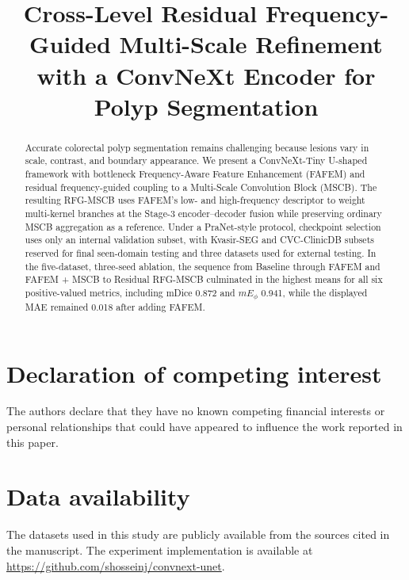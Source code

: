 \documentclass[
  10pt,
]{article}
\title{Cross-Level Residual Frequency-Guided Multi-Scale Refinement with a ConvNeXt Encoder for Polyp Segmentation}
\author{}
\date{}
\begin{document}
\maketitle

\begin{abstract}
Accurate colorectal polyp segmentation remains challenging because lesions vary in scale, contrast, and boundary appearance. We present a ConvNeXt-Tiny U-shaped framework with bottleneck Frequency-Aware Feature Enhancement (FAFEM) and residual frequency-guided coupling to a Multi-Scale Convolution Block (MSCB). The resulting RFG-MSCB uses FAFEM's low- and high-frequency descriptor to weight multi-kernel branches at the Stage-3 encoder--decoder fusion while preserving ordinary MSCB aggregation as a reference. Under a PraNet-style protocol, checkpoint selection uses only an internal validation subset, with Kvasir-SEG and CVC-ClinicDB subsets reserved for final seen-domain testing and three datasets used for external testing. In the five-dataset, three-seed ablation, the sequence from Baseline through FAFEM and FAFEM + MSCB to Residual RFG-MSCB culminated in the highest means for all six positive-valued metrics, including mDice 0.872 and $mE_{\phi}$ 0.941, while the displayed MAE remained 0.018 after adding FAFEM.
\end{abstract}














\section*{Declaration of competing
interest}\label{declaration-of-competing-interest}

The authors declare that they have no known competing financial
interests or personal relationships that could have appeared to
influence the work reported in this paper.

\section*{Data availability}\label{data-availability}

The datasets used in this study are publicly available from the sources cited in the
manuscript. The experiment implementation is available at
\url{https://github.com/shosseinj/convnext-unet}.

\label{references}


\end{document}
